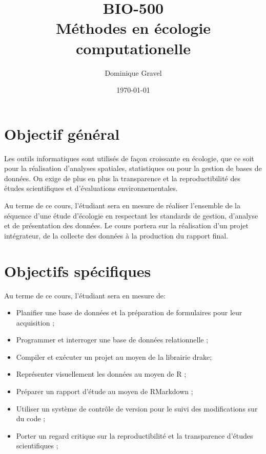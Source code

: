 \documentclass[12]{article}
\title{BIO-500 \\ Méthodes en écologie computationelle}
\date {\today}
\author {Dominique Gravel}
\affil {Département de biologie \\
Université de Sherbrooke \\ 
Local D8-3066 \\ 
819-821-8000 \#66589}
\affil {\url{dominique.gravel@usherbrooke.ca}}
\begin{document}
	\maketitle

	\section*{Objectif général}

	Les outils informatiques sont utilisés de façon croissante en écologie,
	que ce soit pour la réalisation d'analyses spatiales, statistiques ou pour
	la gestion de bases de données. On exige de plus en plus la transparence et
	la reproductibilité des études scientifiques et d'évaluations environnementales. 

	Au terme de ce cours, l'étudiant sera en mesure de réaliser l'ensemble de la 
	séquence d'une étude d'écologie en respectant les standards de gestion,  d'analyse et de présentation des données. Le cours portera sur la réalisation d'un projet intégrateur, de la collecte des données à la production du rapport final. 

	\section*{Objectifs spécifiques}

	Au terme de ce cours, l'étudiant sera en mesure de: 

	\begin{itemize}
	\renewcommand{\labelitemi}{$\bullet$}

	\item Planifier une base de données et la préparation de formulaires pour leur acquisition ; 

	\item Programmer et interroger une base de données relationnelle ;

	\item Compiler et exécuter un projet au moyen de la librairie drake;

	\item Représenter visuellement les données au moyen de R ;

	\item Préparer un rapport d'étude au moyen de RMarkdown ;

	\item Utiliser un système de contrôle de version pour le suivi des modifications sur du code ;

	\item Porter un regard critique sur la reproductibilité et la transparence d'études scientifiques ;

	\end{itemize}
\end{document}
